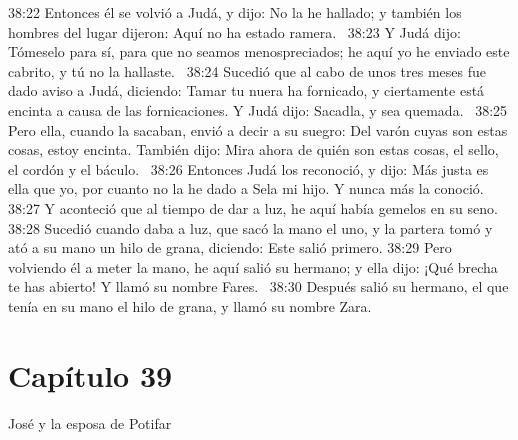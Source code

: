 38:22 Entonces él se volvió a Judá, y dijo: No la he hallado; y también los hombres del lugar dijeron: Aquí no ha estado ramera.  
38:23 Y Judá dijo: Tómeselo para sí, para que no seamos menospreciados; he aquí yo he enviado este cabrito, y tú no la hallaste.  
38:24 Sucedió que al cabo de unos tres meses fue dado aviso a Judá, diciendo: Tamar tu nuera ha fornicado, y ciertamente está encinta a causa de las fornicaciones. Y Judá dijo: Sacadla, y sea quemada.  
38:25 Pero ella, cuando la sacaban, envió a decir a su suegro: Del varón cuyas son estas cosas, estoy encinta. También dijo: Mira ahora de quién son estas cosas, el sello, el cordón y el báculo.  
38:26 Entonces Judá los reconoció, y dijo: Más justa es ella que yo, por cuanto no la he dado a Sela mi hijo. Y nunca más la conoció.  
38:27 Y aconteció que al tiempo de dar a luz, he aquí había gemelos en su seno.  
38:28 Sucedió cuando daba a luz, que sacó la mano el uno, y la partera tomó y ató a su mano un hilo de grana, diciendo: Este salió primero. 
38:29 Pero volviendo él a meter la mano, he aquí salió su hermano; y ella dijo: ¡Qué brecha te has abierto! Y llamó su nombre Fares.  
38:30 Después salió su hermano, el que tenía en su mano el hilo de grana, y llamó su nombre Zara.  
\section*{Capítulo 39 }
José y la esposa de Potifar  

